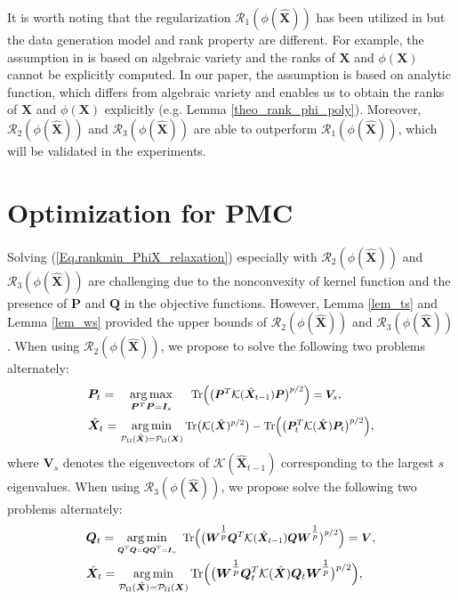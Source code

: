 \documentclass[letterpaper]{article} %
\begin{document}
It is worth noting that the regularization $\mathcal{R}_1(\phi(\hat{\bm{X}}))$ has been utilized in \cite{pmlr-v70-ongie17a,FANNLMC} but the data generation model and rank property are different.
For example, the assumption in \cite{pmlr-v70-ongie17a} is based on algebraic variety and the ranks of $\bm{X}$ and $\phi(\bm{X})$ cannot be explicitly computed. In our paper, the assumption is based on analytic function, which differs from algebraic variety and enables us to obtain the ranks of $\bm{X}$ and $\phi(\bm{X})$ explicitly (e.g. Lemma \ref{theo_rank_phi_poly}). Moreover, $\mathcal{R}_2(\phi(\hat{\bm{X}}))$ and $\mathcal{R}_3(\phi(\hat{\bm{X}}))$ are able to outperform $\mathcal{R}_1(\phi(\hat{\bm{X}}))$, which will be validated in the experiments.

\section{Optimization for PMC}
Solving (\ref{Eq.rankmin_PhiX_relaxation}) especially with $\mathcal{R}_2(\phi(\hat{\bm{X}}))$ and $\mathcal{R}_3(\phi(\hat{\bm{X}}))$ are challenging due to the nonconvexity of kernel function and the presence of $\bm{P}$ and $\bm{Q}$ in the objective functions. However, Lemma \ref{lem_ts} and Lemma \ref{lem_ws} provided the upper bounds of $\mathcal{R}_2(\phi(\hat{\bm{X}}))$ and $\mathcal{R}_3(\phi(\hat{\bm{X}}))$.
When using $\mathcal{R}_2(\phi(\hat{\bm{X}}))$, we propose to solve the following two problems alternately:
\begin{equation}\label{Eq.AM_S}
\begin{aligned}
&\bm{P}_t=\quad \mathop{\arg\max}_{\bm{P}^T\bm{P}=\bm{I}_s}\quad\ \scaleobj{0.9}{\textup{Tr}\Big(\big(\bm{P}^T\mathcal{K}(\hat{\bm{X}}_{t-1})\bm{P}\big)^{p/2}\Big)=\bm{V}_s},\\
&\hat{\bm{X}}_t=\mathop{\arg\min}_{\scaleobj{0.9}{\mathcal{P}_{\Omega}(\hat{\bm{X}})=\mathcal{P}_{\Omega}(\bm{X})}} \scaleobj{0.9}{\textup{Tr}\big(\mathcal{K}(\hat{\bm{X}})^{p/2}\big)-\textup{Tr}\Big(\big(\bm{P}_t^T\mathcal{K}(\hat{\bm{X}})\bm{P}_t\big)^{p/2}\Big)},
\end{aligned}
\end{equation}
where $\bm{V}_s$ denotes the eigenvectors of $\mathcal{K}(\hat{\bm{X}}_{t-1})$ corresponding to the largest $s$ eigenvalues.  
When using $\mathcal{R}_3(\phi(\hat{\bm{X}}))$, we propose solve the following two problems alternately:
\begin{equation}\label{Eq.AM_W}
\begin{aligned}
&\bm{Q}_t=\mathop{\arg\min}_{\scaleobj{0.8}{\bm{Q}^T\bm{Q}=\bm{Q}\bm{Q}^T=\bm{I}_n}}\ \scaleobj{0.9}{\textup{Tr}\Big(\big(\bm{W}^{\tfrac{1}{p}}\bm{Q}^T\mathcal{K}(\hat{\bm{X}}_{t-1})\bm{Q}\bm{W}^{\tfrac{1}{p}}\big)^{p/2}\Big)}=\scaleobj{0.9}{\bm{V}},\\
&\hat{\bm{X}}_t=\mathop{\arg\min}_{\mathcal{P}_{\Omega}(\hat{\bm{X}})=\mathcal{P}_{\Omega}(\bm{X})} \textup{Tr}\Big(\big(\bm{W}^{\tfrac{1}{p}}\bm{Q}_t^T\mathcal{K}(\hat{\bm{X}})\bm{Q}_t\bm{W}^{\tfrac{1}{p}}\big)^{p/2}\Big),
\end{aligned}
\end{equation}
\end{document}
